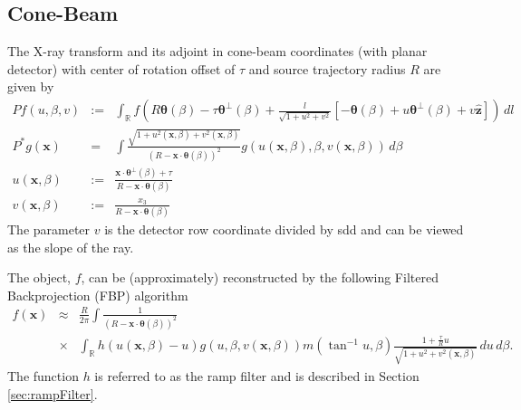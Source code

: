 \documentclass[11pt]{article}
\begin{document}



\subsection{Cone-Beam}

The X-ray transform and its adjoint in cone-beam coordinates (with planar detector) with center of rotation offset of $\tau$ and source trajectory radius $R$ are given by
\begin{eqnarray*}
Pf(u,\beta,v) &:=& \int_\mathbb{R} f\left(R\bm{\theta}(\beta) - \tau\bm{\theta}^\perp(\beta) + \frac{l}{\sqrt{1+u^2+v^2}}\left[-\bm{\theta}(\beta)+u\bm{\theta}^\perp(\beta) + v\widehat{\bm{z}} \right] \right) \, dl \\
P^*g(\bm{x}) &=& \int \frac{\sqrt{1+ u^2(\bm{x},\beta) +v^2(\bm{x},\beta)}}{(R-\bm{x}\cdot\bm{\theta}(\beta))^2} g\left( u(\bm{x},\beta), \beta, v(\bm{x},\beta)\right) \, d\beta \\
u(\bm{x},\beta) &:=& \frac{\bm{x}\cdot \bm{\theta}^\perp(\beta) + \tau}{R - \bm{x}\cdot\bm{\theta}(\beta)} \\
v(\bm{x},\beta) &:=& \frac{x_3}{R - \bm{x}\cdot\bm{\theta}(\beta)}
\end{eqnarray*}
The parameter $v$ is the detector row coordinate divided by sdd and can be viewed as the slope of the ray.

The object, $f$, can be (approximately) reconstructed by the following Filtered Backprojection (FBP) algorithm
\begin{eqnarray*}
f(\bm{x}) &\approx& \frac{R}{2\pi} \int \frac{1}{(R-\bm{x}\cdot\bm{\theta}(\beta))^2} \\ &\times& \int_\mathbb{R} h(u(\bm{x},\beta) - u) g(u,\beta, v(\bm{x},\beta)) m(\tan^{-1}u,\beta) \frac{1+\frac{\tau}{R}u}{\sqrt{1+u^2+v^2(\bm{x},\beta)}} \, du \, d\beta.
\end{eqnarray*}
The function $h$ is referred to as the ramp filter and is described in Section \ref{sec:rampFilter}.
\end{document}
